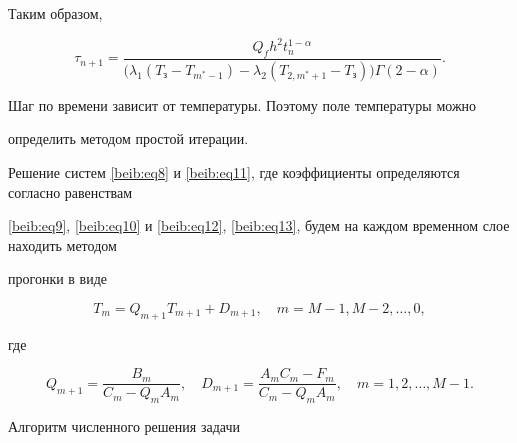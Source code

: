 Таким образом,

\begin{equation}

\label{beib:eq14}

\tau_{n+1} =\frac{Q_f h^2  t_n^{1-\alpha } }{\big(\lambda _1 (T_{\text{з}} 

-T_{m^\ast -1} )-\lambda _2 (T_{2,m^\ast +1} -T_{\text{з}})\big)  \Gamma (2-\alpha 

)}.

\end{equation}



Шаг по времени зависит от температуры. Поэтому поле температуры можно 

определить методом простой итерации. 



Решение систем \eqref{beib:eq8} и \eqref{beib:eq11}, где коэффициенты определяются согласно равенствам 

\eqref{beib:eq9}, \eqref{beib:eq10} и \eqref{beib:eq12}, \eqref{beib:eq13}, будем на каждом временном слое находить методом 

прогонки в виде

\begin{equation}

\label{beib:eq15}

T_m =Q_{m+1} T_{m+1} +D_{m+1} ,\quad m=M-1, M-2,\ldots, 0,

\end{equation}

где 

\begin{equation}

\label{beib:eq16}

Q_{m+1} =\frac{B_m }{C_m -Q_m A_m },\quad D_{m+1} =\frac{A_m C_m -F_m 

}{C_m -Q_m A_m },\quad m=1,2,\ldots,M-1.

\end{equation}



\smallskip



{\small \sc Алгоритм численного решения задачи}

